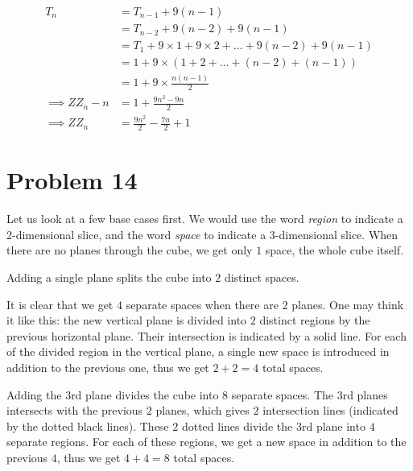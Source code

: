 \begin{align*}
    T_n               & = T_{n-1} + 9(n-1)                                     \\
                      & = T_{n-2} + 9(n-2) + 9(n-1)                            \\
                      & = T_1 + 9\times1 + 9\times2 + \ldots + 9(n-2) + 9(n-1) \\
                      & = 1 + 9\times(1+2+\ldots+(n-2) + (n-1))                \\
                      & = 1 + 9\times \frac{n(n-1)}{2}                         \\
    \implies ZZ_n - n & = 1 + \frac{9n^2-9n}{2}                                \\
    \implies ZZ_n     & = \frac{9n^2}{2} - \frac{7n}{2} + 1
\end{align*}

\section*{Problem 14}
Let us look at a few base cases first. We would use the word \textit{region} to indicate a 2-dimensional slice, and the word \textit{space} to indicate a 3-dimensional slice. When there are no planes through the cube, we get only $1$ space, the whole cube itself.
\begin{figure}[h!]
    \centering
    
\end{figure}

Adding a single plane splits the cube into $2$ distinct spaces.
\begin{figure}[h!]
    \centering
    
\end{figure}

It is clear that we get $4$ separate spaces when there are $2$ planes. One may think it like this: the new vertical plane is divided into $2$ distinct regions by the previous horizontal plane. Their intersection is indicated by a solid line. For each of the divided region in the vertical plane, a single new space is introduced in addition to the previous one, thus we get $2 + 2 = 4$ total spaces.
\begin{figure}[h!]
    \centering
    
\end{figure}
\clearpage

Adding the $3$rd plane divides the cube into $8$ separate spaces. The $3$rd planes intersects with the previous $2$ planes, which gives $2$ intersection lines (indicated by the dotted black lines). These $2$ dotted lines divide the $3$rd plane into $4$ separate regions. For each of these regions, we get a new space in addition to the previous $4$, thus we get $4 + 4 = 8$ total spaces.
\begin{figure}[h!]
    \centering
    
\end{figure}

